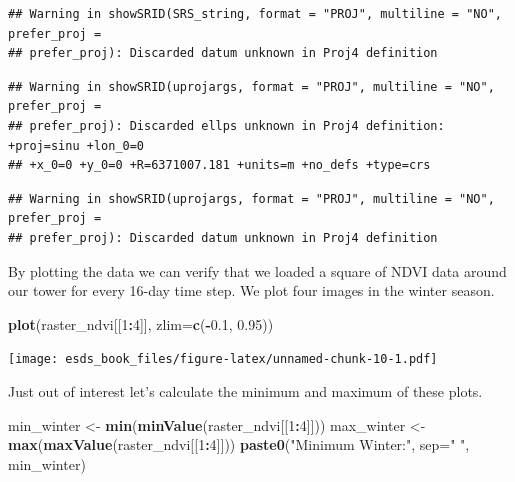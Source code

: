 \documentclass[
]{book}
\newenvironment{Shaded}{\begin{snugshade}}{\end{snugshade}}
\newcommand{\DataTypeTok}[1]{\textcolor[rgb]{0.13,0.29,0.53}{#1}}
\newcommand{\DecValTok}[1]{\textcolor[rgb]{0.00,0.00,0.81}{#1}}
\newcommand{\FloatTok}[1]{\textcolor[rgb]{0.00,0.00,0.81}{#1}}
\newcommand{\KeywordTok}[1]{\textcolor[rgb]{0.13,0.29,0.53}{\textbf{#1}}}
\newcommand{\NormalTok}[1]{#1}
\newcommand{\OperatorTok}[1]{\textcolor[rgb]{0.81,0.36,0.00}{\textbf{#1}}}
\newcommand{\StringTok}[1]{\textcolor[rgb]{0.31,0.60,0.02}{#1}}
\begin{document}
\begin{verbatim}
## Warning in showSRID(SRS_string, format = "PROJ", multiline = "NO", prefer_proj =
## prefer_proj): Discarded datum unknown in Proj4 definition
\end{verbatim}

\begin{verbatim}
## Warning in showSRID(uprojargs, format = "PROJ", multiline = "NO", prefer_proj =
## prefer_proj): Discarded ellps unknown in Proj4 definition: +proj=sinu +lon_0=0
## +x_0=0 +y_0=0 +R=6371007.181 +units=m +no_defs +type=crs
\end{verbatim}

\begin{verbatim}
## Warning in showSRID(uprojargs, format = "PROJ", multiline = "NO", prefer_proj =
## prefer_proj): Discarded datum unknown in Proj4 definition
\end{verbatim}

By plotting the data we can verify that we loaded a square of NDVI data around our tower for every 16-day time step.
We plot four images in the winter season.

\begin{Shaded}
\begin{Highlighting}[]
\KeywordTok{plot}\NormalTok{(raster_ndvi[[}\DecValTok{1}\OperatorTok{:}\DecValTok{4}\NormalTok{]], }\DataTypeTok{zlim=}\KeywordTok{c}\NormalTok{(}\OperatorTok{-}\FloatTok{0.1}\NormalTok{, }\FloatTok{0.95}\NormalTok{))}
\end{Highlighting}
\end{Shaded}

\texttt{[image: esds\_book\_files/figure-latex/unnamed-chunk-10-1.pdf]}

Just out of interest let's calculate the minimum and maximum of these plots.

\begin{Shaded}
\begin{Highlighting}[]
\NormalTok{min_winter <-}\StringTok{ }\KeywordTok{min}\NormalTok{(}\KeywordTok{minValue}\NormalTok{(raster_ndvi[[}\DecValTok{1}\OperatorTok{:}\DecValTok{4}\NormalTok{]]))}
\NormalTok{max_winter <-}\StringTok{ }\KeywordTok{max}\NormalTok{(}\KeywordTok{maxValue}\NormalTok{(raster_ndvi[[}\DecValTok{1}\OperatorTok{:}\DecValTok{4}\NormalTok{]]))}
\KeywordTok{paste0}\NormalTok{(}\StringTok{"Minimum Winter:"}\NormalTok{, }\DataTypeTok{sep=}\StringTok{" "}\NormalTok{, min_winter)}
\end{Highlighting}
\end{Shaded}
\end{document}
